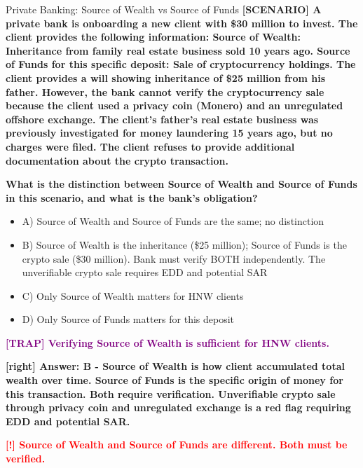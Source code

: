 \documentclass[11pt,a4paper]{beamer}
\newcommand{\redflag}[1]{\textcolor{red}{\textbf{[!] #1}}}
\newcommand{\trap}[1]{\textcolor{purple}{\textbf{[TRAP] #1}}}
\newcommand{\correct}[1]{\textcolor{green!50!black}{\textbf{[right] #1}}}
\newcommand{\scenario}[1]{\textcolor{blue!70!black}{\textbf{[SCENARIO] #1}}}
\begin{document}
	
	\begin{frame}{Private Banking: Source of Wealth vs Source of Funds}
		\tiny
		\scenario{A private bank is onboarding a new client with \$30 million to invest. The client provides the following information: Source of Wealth: Inheritance from family real estate business sold 10 years ago. Source of Funds for this specific deposit: Sale of cryptocurrency holdings. The client provides a will showing inheritance of \$25 million from his father. However, the bank cannot verify the cryptocurrency sale because the client used a privacy coin (Monero) and an unregulated offshore exchange. The client's father's real estate business was previously investigated for money laundering 15 years ago, but no charges were filed. The client refuses to provide additional documentation about the crypto transaction.}
		
		\vspace{0.02cm}
		\textbf{What is the distinction between Source of Wealth and Source of Funds in this scenario, and what is the bank's obligation?}
		\vspace{0.02cm}
		
		\begin{itemize}
			\item A) Source of Wealth and Source of Funds are the same; no distinction
			\item B) Source of Wealth is the inheritance (\$25 million); Source of Funds is the crypto sale (\$30 million). Bank must verify BOTH independently. The unverifiable crypto sale requires EDD and potential SAR
			\item C) Only Source of Wealth matters for HNW clients
			\item D) Only Source of Funds matters for this deposit
		\end{itemize}
		
		\vspace{0.02cm}
		\trap{Verifying Source of Wealth is sufficient for HNW clients.}
		
		\vspace{0.02cm}
		\correct{Answer: B - Source of Wealth is how client accumulated total wealth over time. Source of Funds is the specific origin of money for this transaction. Both require verification. Unverifiable crypto sale through privacy coin and unregulated exchange is a red flag requiring EDD and potential SAR.}
		
		\vspace{0.02cm}
		\redflag{Source of Wealth and Source of Funds are different. Both must be verified.}
	\end{frame}
	
\end{document}
